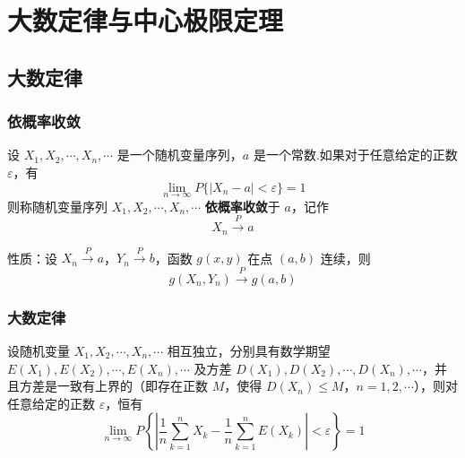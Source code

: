 
\chapter{大数定律与中心极限定理}

\section{大数定律}

\subsection{依概率收敛}

\begin{definition}
    设 $X_1, X_2, \cdots, X_n, \cdots$ 是一个随机变量序列，$a$ 是一个常数.如果对于任意给定的正数 $\varepsilon$，有
    $$
    \lim_{n \to \infty} P \{ |X_n-a| < \varepsilon \} = 1
    $$
    则称随机变量序列 $X_1, X_2, \cdots, X_n, \cdots$ \textbf{依概率收敛}于 $a$，记作
    $$
    X_n \overset{P}{\longrightarrow} a
    $$
\end{definition}

性质：设 $X_n \overset{P}{\longrightarrow} a$，$Y_n \overset{P}{\longrightarrow} b$，函数 $g(x,y)$ 在点 $(a,b)$ 连续，则
$$
g(X_n, Y_n) \overset{P}{\longrightarrow} g(a,b)
$$

\subsection{大数定律}

\begin{theorem}[][切比雪夫定理]
    设随机变量 $X_1, X_2, \cdots, X_n, \cdots$ 相互独立，分别具有数学期望 $E(X_1), E(X_2), \cdots, E(X_n), \cdots$ 及方差 $D(X_1), D(X_2), \cdots, D(X_n), \cdots$，并且方差是一致有上界的（即存在正数 $M$，使得 $D(X_n) \leqslant M$，$n=1,2,\cdots$），则对任意给定的正数 $\varepsilon$，恒有
    $$
    \lim_{n \to \infty} P \left\{ \left| \dfrac{1}{n} \sum_{k=1}^n X_k - \dfrac{1}{n} \sum_{k=1}^n E(X_k) \right| < \varepsilon \right\} = 1
    $$
\end{theorem}

